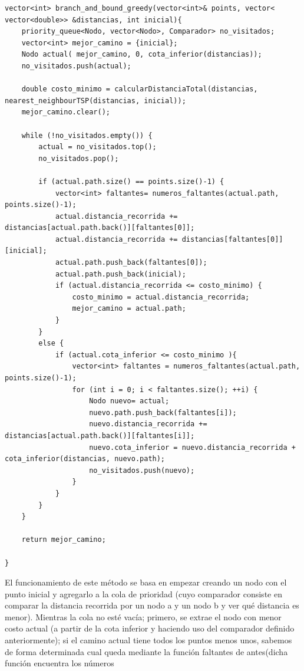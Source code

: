 \documentclass[11pt,openany]{book}
\begin{document}
\begin{lstlisting}
vector<int> branch_and_bound_greedy(vector<int>& points, vector< vector<double>> &distancias, int inicial){
    priority_queue<Nodo, vector<Nodo>, Comparador> no_visitados;
    vector<int> mejor_camino = {inicial};
    Nodo actual( mejor_camino, 0, cota_inferior(distancias));
    no_visitados.push(actual);

    double costo_minimo = calcularDistanciaTotal(distancias, nearest_neighbourTSP(distancias, inicial));
    mejor_camino.clear();

    while (!no_visitados.empty()) {
        actual = no_visitados.top();
        no_visitados.pop();

        if (actual.path.size() == points.size()-1) {
            vector<int> faltantes= numeros_faltantes(actual.path, points.size()-1);
            actual.distancia_recorrida += distancias[actual.path.back()][faltantes[0]];
            actual.distancia_recorrida += distancias[faltantes[0]][inicial];
            actual.path.push_back(faltantes[0]);
            actual.path.push_back(inicial);
            if (actual.distancia_recorrida <= costo_minimo) {
                costo_minimo = actual.distancia_recorrida;
                mejor_camino = actual.path;
            }
        } 
        else { 
            if (actual.cota_inferior <= costo_minimo ){
                vector<int> faltantes = numeros_faltantes(actual.path, points.size()-1);
                for (int i = 0; i < faltantes.size(); ++i) {
                    Nodo nuevo= actual;
                    nuevo.path.push_back(faltantes[i]);
                    nuevo.distancia_recorrida += distancias[actual.path.back()][faltantes[i]];
                    nuevo.cota_inferior = nuevo.distancia_recorrida + cota_inferior(distancias, nuevo.path);
                    no_visitados.push(nuevo);
                }
            }
        }
    }

    return mejor_camino;

}
\end{lstlisting}
El funcionamiento de este método se basa en empezar creando un nodo con el punto inicial y agregarlo a la cola de prioridad (cuyo comparador
consiste en comparar la distancia recorrida por un nodo a y un nodo b y ver qué distancia es menor). Mientras la cola no esté vacía; primero,
se extrae el nodo con menor costo actual (a partir de la cota inferior y haciendo uso del comparador definido anteriormente); si el camino actual 
tiene todos los puntos menos unos, sabemos de forma determinada cual queda mediante la función faltantes de antes(dicha función encuentra los números
\end{document}
